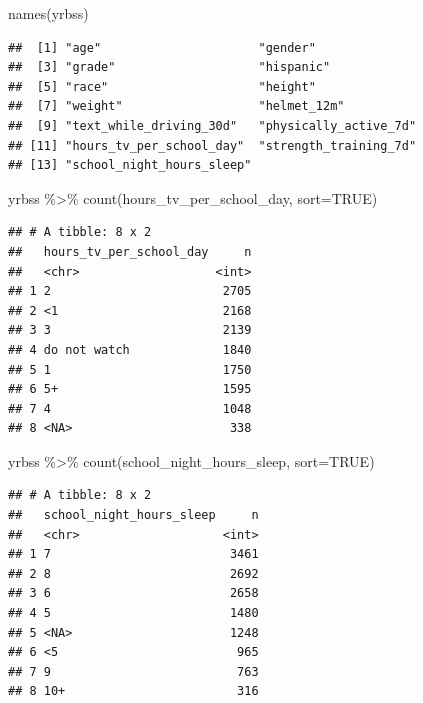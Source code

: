 \documentclass[
]{article}
\newenvironment{Shaded}{\begin{snugshade}}{\end{snugshade}}
\newcommand{\AttributeTok}[1]{\textcolor[rgb]{0.77,0.63,0.00}{#1}}
\newcommand{\ConstantTok}[1]{\textcolor[rgb]{0.00,0.00,0.00}{#1}}
\newcommand{\FunctionTok}[1]{\textcolor[rgb]{0.00,0.00,0.00}{#1}}
\newcommand{\NormalTok}[1]{#1}
\newcommand{\SpecialCharTok}[1]{\textcolor[rgb]{0.00,0.00,0.00}{#1}}
\begin{document}
\begin{Shaded}
\begin{Highlighting}[]
\FunctionTok{names}\NormalTok{(yrbss)}
\end{Highlighting}
\end{Shaded}

\begin{verbatim}
##  [1] "age"                      "gender"                  
##  [3] "grade"                    "hispanic"                
##  [5] "race"                     "height"                  
##  [7] "weight"                   "helmet_12m"              
##  [9] "text_while_driving_30d"   "physically_active_7d"    
## [11] "hours_tv_per_school_day"  "strength_training_7d"    
## [13] "school_night_hours_sleep"
\end{verbatim}

\begin{Shaded}
\begin{Highlighting}[]
\NormalTok{yrbss }\SpecialCharTok{\%\textgreater{}\%}
  \FunctionTok{count}\NormalTok{(hours\_tv\_per\_school\_day, }\AttributeTok{sort=}\ConstantTok{TRUE}\NormalTok{)}
\end{Highlighting}
\end{Shaded}

\begin{verbatim}
## # A tibble: 8 x 2
##   hours_tv_per_school_day     n
##   <chr>                   <int>
## 1 2                        2705
## 2 <1                       2168
## 3 3                        2139
## 4 do not watch             1840
## 5 1                        1750
## 6 5+                       1595
## 7 4                        1048
## 8 <NA>                      338
\end{verbatim}

\begin{Shaded}
\begin{Highlighting}[]
\NormalTok{yrbss }\SpecialCharTok{\%\textgreater{}\%}
  \FunctionTok{count}\NormalTok{(school\_night\_hours\_sleep, }\AttributeTok{sort=}\ConstantTok{TRUE}\NormalTok{)}
\end{Highlighting}
\end{Shaded}

\begin{verbatim}
## # A tibble: 8 x 2
##   school_night_hours_sleep     n
##   <chr>                    <int>
## 1 7                         3461
## 2 8                         2692
## 3 6                         2658
## 4 5                         1480
## 5 <NA>                      1248
## 6 <5                         965
## 7 9                          763
## 8 10+                        316
\end{verbatim}
\end{document}
